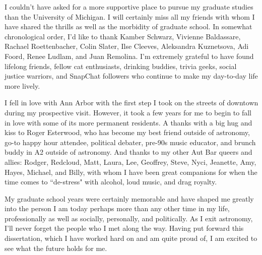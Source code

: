I couldn't have asked for a more supportive place to pursue my graduate studies than the University of Michigan. I will certainly miss all my friends with whom I have shared the thrills as well as the morbidity of graduate school. In somewhat chronological order, I'd like to thank Kamber Schwarz, Vivienne Baldassare, Rachael Roettenbacher, Colin Slater, Ilse Cleeves, Aleksandra Kuznetsova, Adi Foord, Renee Ludlam, and Juan Remolina. I'm extremely grateful to have found lifelong friends, fellow cat enthusiasts, drinking buddies, trivia geeks, social justice warriors, and SnapChat followers who continue to make my day-to-day life more lively.

I fell in love with Ann Arbor with the first step I took on the streets of downtown during my prospective visit. However, it took a few years for me to begin to fall in love with some of its more permanent residents. A thanks with a big hug and kiss to Roger Esterwood, who has become my best friend outside of astronomy, go-to happy hour attendee, political debater, pre-90s music educator, and brunch buddy in A2 outside of astronomy. And thanks to my other Aut Bar queers and allies: Rodger, Redcloud, Matt, Laura, Lee, Geoffrey, Steve, Nyci, Jeanette, Amy, Hayes, Michael, and Billy, with whom I have been great companions for when the time comes to ``de-stress" with alcohol, loud music, and drag royalty.

My graduate school years were certainly memorable and have shaped me greatly into the person I am today perhaps more than any other time in my life, professionally as well as socially, personally, and politically. As I exit astronomy, I'll never forget the people who I met along the way. Having put forward this dissertation, which I have worked hard on and am quite proud of, I am excited to see what the future holds for me.